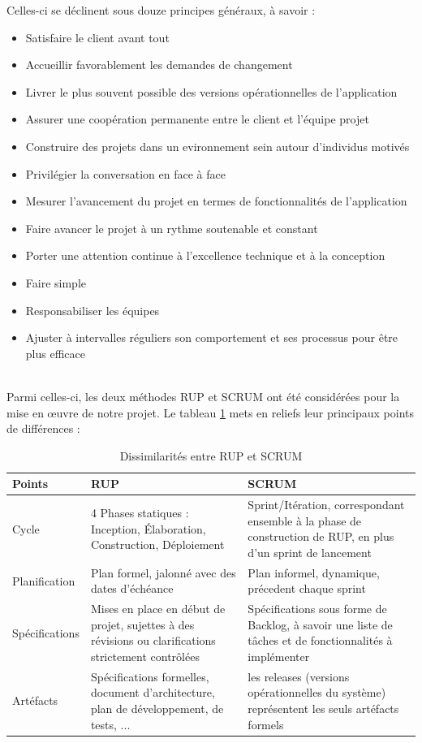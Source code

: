 \begin{spacing}{1.5}
Celles-ci se déclinent sous douze principes généraux, à savoir :
\begin{itemize}
    \item Satisfaire le client avant tout
    \item Accueillir favorablement les demandes de changement
    \item Livrer le plus souvent possible des versions opérationnelles de l’application
    \item Assurer une coopération permanente entre le client et l’équipe projet
    \item Construire des projets dans un evironnement sein autour d’individus motivés
    \item Privilégier la conversation en face à face
    \item Mesurer l’avancement du projet en termes de fonctionnalités de l’application
    \item Faire avancer le projet à un rythme soutenable et constant
    \item Porter une attention continue à l’excellence technique et à la conception
    \item Faire simple
    \item Responsabiliser les équipes
    \item Ajuster à intervalles réguliers son comportement et ses processus pour être plus efficace
\end{itemize}
\\
Parmi celles-ci, les deux méthodes RUP et SCRUM ont été considérées pour la mise en œuvre de notre projet. Le tableau \ref{RUPvsSCRUM} mets en reliefs leur principaux points de différences :
\begin{table}[h]
    \centering
    \begin{tabular}{|l|p{6.5cm}|p{6.5cm}|}
    \hline
        Points & RUP & SCRUM\\
    \hline
        Cycle & 4 Phases statiques : Inception, Élaboration, Construction, Déploiement & Sprint/Itération, correspondant ensemble à la phase de construction de RUP, en plus d'un sprint de lancement\\
    \hline
        Planification & Plan formel, jalonné avec des dates d'échéance & Plan informel, dynamique, précedent chaque sprint\\
    \hline
        Spécifications & Mises en place en début de projet, sujettes à des révisions ou clarifications strictement contrôlées & Spécifications sous forme de Backlog, à savoir une liste de tâches et de fonctionnalités à implémenter\\
    \hline
        Artéfacts & Spécifications formelles, document d'architecture, plan de développement, de tests, ... & les releases (versions opérationnelles du système) représentent les seuls artéfacts formels\\
    \hline
    \end{tabular}
    \caption{Dissimilarités entre RUP et SCRUM}
    \label{RUPvsSCRUM}


\end{table}
\end{spacing}
